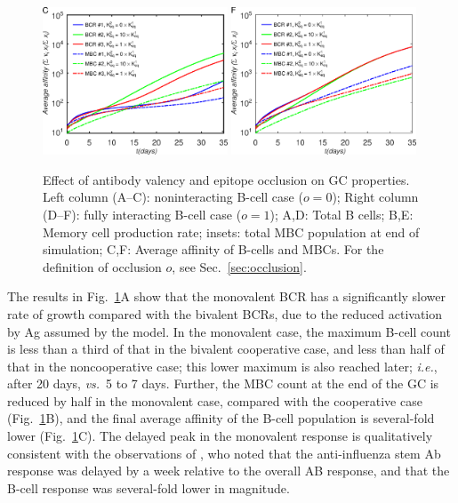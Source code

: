 \documentclass[utf8]{frontiersHLTH}%
\def\ie {{\it i.e.}}
\def\vs {{\it vs.}}
\newcommand{\fig}[1]{Fig.~\ref{fig:#1}}
\newcommand{\Sec}[1]{Sec.~\ref{sec:#1}}
\renewcommand{\sec}[1]{\Sec{#1}}
\begin{document}
{\begin{figure}
\includegraphics[width=0.49\textwidth]{../fig4abc/A.eps}
\includegraphics[width=0.49\textwidth]{../fig4def/A.eps}
\caption{Effect of antibody valency and epitope occlusion on GC properties.
Left column (A--C): noninteracting B-cell case ($o=0$);
Right column (D--F): fully interacting B-cell case ($o=1$);
A,D: Total B cells;
B,E: Memory cell production rate; insets: total MBC population at end of simulation;
C,F: Average affinity of B-cells and MBCs.  For the definition of occlusion $o$, see \sec{occlusion}.
}
\label{fig:avidity}
\end{figure}
}

The results in \fig{avidity}A show that the monovalent BCR has a
significantly slower rate of growth compared with the bivalent BCRs, due to
the reduced activation by Ag assumed by the model. In the monovalent case,
the maximum B-cell count is less than a third of that in the bivalent
cooperative case, and less than half of that in the noncooperative case;
this lower maximum is also reached later; \ie, after 20 days, \vs~5 to 7 days.
Further,
the MBC count at the end of the GC is reduced by half in the monovalent case, compared with the cooperative case
(\fig{avidity}B), and the final average
affinity of the B-cell population is several-fold lower (\fig{avidity}C).
The delayed peak in the
monovalent response is qualitatively consistent with the observations of \citet{tan19},
who noted that the anti-influenza stem Ab response was delayed by a week relative
to the overall AB response, and that the B-cell response was several-fold
lower in magnitude.
\end{document}
